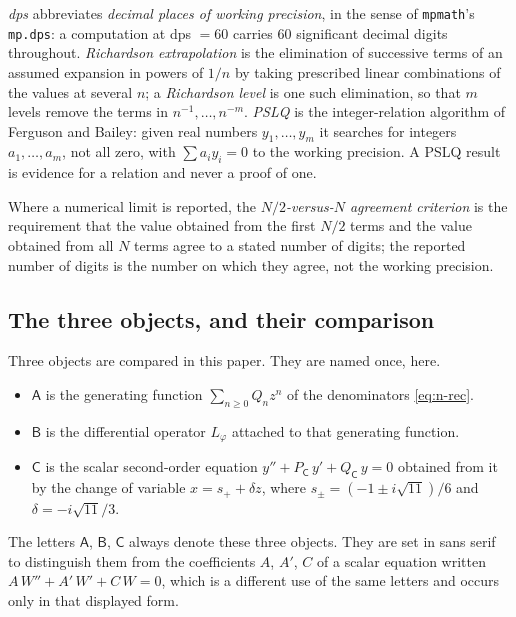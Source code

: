 \emph{dps} abbreviates \emph{decimal places of working precision}, in the sense
of \texttt{mpmath}'s \texttt{mp.dps}: a computation at dps $=60$ carries $60$
significant decimal digits throughout. \emph{Richardson extrapolation} is the
elimination of successive terms of an assumed expansion in powers of $1/n$ by
taking prescribed linear combinations of the values at several $n$; a
\emph{Richardson level} is one such elimination, so that $m$ levels remove the
terms in $n^{-1},\dots,n^{-m}$. \emph{PSLQ} is the integer-relation algorithm
of Ferguson and Bailey: given real numbers $y_1,\dots,y_m$ it searches for
integers $a_1,\dots,a_m$, not all zero, with $\sum a_i y_i=0$ to the working
precision. A PSLQ result is evidence for a relation and never a proof of one.

Where a numerical limit is reported, the \emph{$N/2$-versus-$N$ agreement
criterion} is the requirement that the value obtained from the first $N/2$
terms and the value obtained from all $N$ terms agree to a stated number of
digits; the reported number of digits is the number on which they agree, not
the working precision.

\subsection{The three objects, and their comparison}\label{ssec:objects}

Three objects are compared in this paper. They are named once, here.

\begin{itemize}
\item \textbf{$\mathsf A$} is the generating function $\sum_{n\ge0}Q_nz^n$ of
  the denominators \eqref{eq:n-rec}.
\item \textbf{$\mathsf B$} is the differential operator $L_\varphi$ attached to
  that generating function.
\item \textbf{$\mathsf C$} is the scalar second-order equation
  $y''+P_{\mathsf C}\,y'+Q_{\mathsf C}\,y=0$ obtained from it by the change of
  variable $x=s_++\delta z$, where $s_\pm=(-1\pm i\sqrt{11})/6$ and
  $\delta=-i\sqrt{11}/3$.
\end{itemize}

The letters $\mathsf A$, $\mathsf B$, $\mathsf C$ always denote these three
objects. They are set in sans serif to distinguish them from the coefficients
$A$, $A'$, $C$ of a scalar equation written $A\,W''+A'\,W'+C\,W=0$, which is a
different use of the same letters and occurs only in that displayed form.

